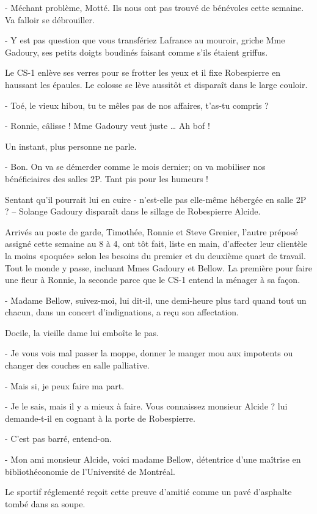 - Méchant problème, Motté. Ils nous ont pas trouvé de bénévoles cette semaine. Va falloir se débrouiller.

- Y est pas question que vous transfériez Lafrance au mouroir, griche Mme Gadoury, ses petits doigts boudinés faisant comme s’ils étaient griffus.

Le CS-1 enlève ses verres pour se frotter les yeux et il fixe Robespierre en haussant les épaules. Le colosse se lève aussitôt et disparaît dans le large couloir.

- Toé, le vieux hibou, tu te mêles pas de nos affaires, t’as-tu compris ?

- Ronnie, câlisse ! Mme Gadoury veut juste … Ah bof !

Un instant, plus personne ne parle.

- Bon. On va se démerder comme le mois dernier; on va mobiliser nos bénéficiaires des salles 2P. Tant pis pour les humeurs !

Sentant qu’il pourrait lui en cuire - n’est-elle pas elle-même hébergée en salle 2P ? – Solange Gadoury disparaît dans le sillage de Robespierre Alcide.

Arrivés au poste de garde, Timothée, Ronnie et Steve Grenier, l’autre préposé assigné cette semaine au 8 à 4, ont tôt fait, liste en main, d’affecter leur clientèle la moins «poquée» selon les besoins du premier et du deuxième quart de travail. Tout le monde y passe, incluant Mmes Gadoury et Bellow. La première pour faire une fleur à Ronnie, la seconde parce que le CS-1 entend la ménager à sa façon.

- Madame Bellow, suivez-moi, lui dit-il, une demi-heure plus tard quand tout un chacun, dans un concert d’indignations, a reçu son affectation.

Docile, la vieille dame lui emboîte le pas.

- Je vous vois mal passer la moppe, donner le manger mou aux impotents ou changer des couches en salle palliative.

- Mais si, je peux faire ma part.

- Je le sais, mais il y a mieux à faire. Vous connaissez monsieur Alcide ? lui demande-t-il en cognant à la porte de Robespierre.

- C’est pas barré, entend-on.

- Mon ami monsieur Alcide, voici madame Bellow, détentrice d’une maîtrise en bibliothéconomie de l’Université de Montréal.

Le sportif réglementé reçoit cette preuve d’amitié comme un pavé d’asphalte tombé dans sa soupe.

